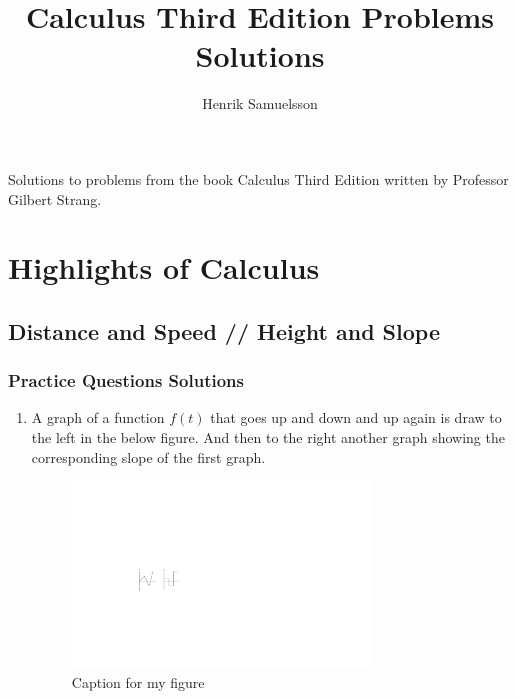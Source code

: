 \documentclass{article}
\title{Calculus Third Edition Problems Solutions}
\author{Henrik Samuelsson}
\begin{document}
\maketitle
Solutions to problems from the book Calculus Third Edition written by Professor Gilbert Strang.
\section{Highlights of Calculus}
\subsection{Distance and Speed // Height and Slope}
\subsubsection{Practice Questions Solutions}
\begin{enumerate}
    \item A graph of a function $f(t)$ that goes up and down and up again is draw to the left in the below figure. And then to the right another graph showing the corresponding slope of the first graph.
    \begin{figure}[h]
        \caption{Caption for my figure}
        \centering
        \includegraphics[width=0.75\textwidth]{slopes.pdf}
      \end{figure}
\end{enumerate}
\end{document}

